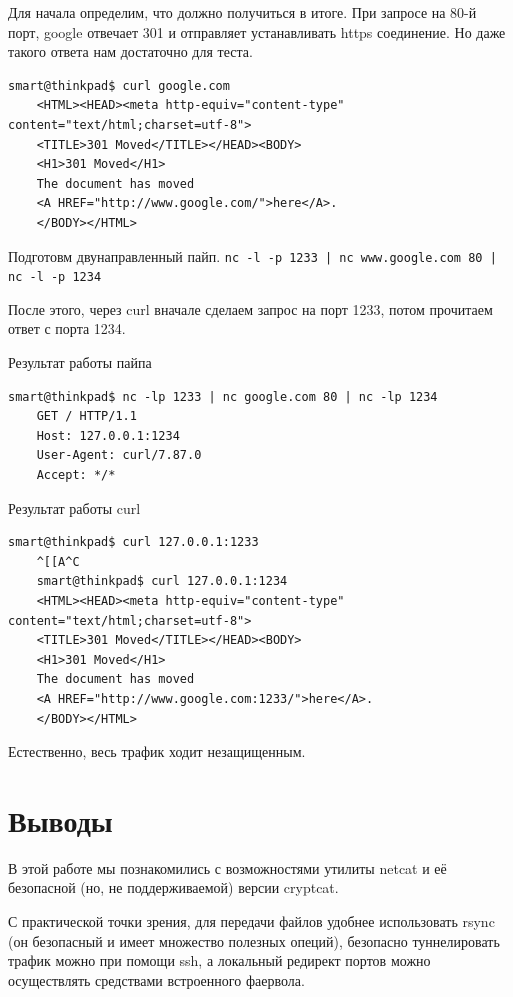 Для начала определим, что должно получиться в итоге. При запросе на 80-й порт, google отвечает 301 и отправляет устанавливать https соединение. Но даже такого ответа нам достаточно для теста.

\begin{Verbatim}[frame=single,breaklines=true,breakanywhere=true]
    smart@thinkpad$ curl google.com
    <HTML><HEAD><meta http-equiv="content-type" content="text/html;charset=utf-8">
    <TITLE>301 Moved</TITLE></HEAD><BODY>
    <H1>301 Moved</H1>
    The document has moved
    <A HREF="http://www.google.com/">here</A>.
    </BODY></HTML>
\end{Verbatim}

Подготовм двунаправленный пайп.
\texttt{nc -l -p 1233 | nc www.google.com 80 | nc -l -p 1234}

После этого, через curl вначале сделаем запрос на порт 1233, потом прочитаем ответ с порта 1234.

Результат работы пайпа
\begin{Verbatim}[frame=single,breaklines=true,breakanywhere=true]
    smart@thinkpad$ nc -lp 1233 | nc google.com 80 | nc -lp 1234
    GET / HTTP/1.1
    Host: 127.0.0.1:1234
    User-Agent: curl/7.87.0
    Accept: */*
\end{Verbatim}

Результат работы curl
\begin{Verbatim}[frame=single,breaklines=true,breakanywhere=true]
    smart@thinkpad$ curl 127.0.0.1:1233
    ^[[A^C
    smart@thinkpad$ curl 127.0.0.1:1234
    <HTML><HEAD><meta http-equiv="content-type" content="text/html;charset=utf-8">
    <TITLE>301 Moved</TITLE></HEAD><BODY>
    <H1>301 Moved</H1>
    The document has moved
    <A HREF="http://www.google.com:1233/">here</A>.
    </BODY></HTML>
\end{Verbatim}

Естественно, весь трафик ходит незащищенным.

\section*{Выводы}

В этой работе мы познакомились с возможностями утилиты netcat и её безопасной (но, не поддерживаемой) версии cryptcat.

С практической точки зрения, для передачи файлов удобнее использовать rsync (он безопасный и имеет множество полезных опеций), безопасно туннелировать трафик можно при помощи ssh, а локальный редирект портов можно осуществлять средствами встроенного фаервола.